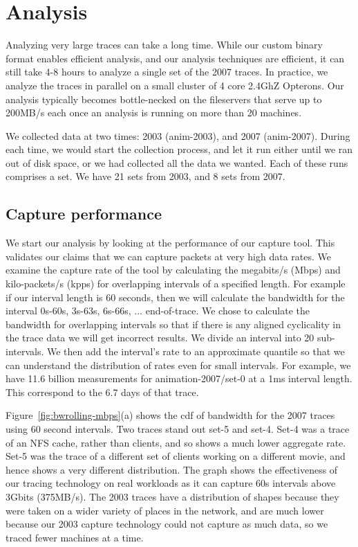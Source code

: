 \section{Analysis}
\label{sec:analysis}

Analyzing very large traces can take a long time.  While our custom
binary format enables efficient analysis, and our analysis techniques
are efficient, it can still take 4-8 hours to analyze a single set of
the 2007 traces.  In practice, we analyze the traces in parallel on a
small cluster of 4 core 2.4GhZ Opterons.  Our analysis typically
becomes bottle-necked on the fileservers that serve up to 200MB/s each
once an analysis is running on more than 20 machines.

We collected data at two times: 2003 (anim-2003), and 2007
(anim-2007).  During each time, we would start the collection
process, and let it run either until we ran out of disk space, or we
had collected all the data we wanted.  Each of these runs comprises a
set.  We have 21 sets from 2003, and 8 sets from 2007.

\subsection{Capture performance}

We start our analysis by looking at the performance of our capture
tool.  This validates our claims that we can capture packets at very
high data rates.  We examine the capture rate of the tool by
calculating the megabits/s (Mbps) and kilo-packets/s (kpps) for
overlapping intervals of a specified length.  For example if our
interval length is 60 seconds, then we will calculate the bandwidth
for the interval 0s-60s, 3s-63s, 6s-66s, ... end-of-trace.  We chose
to calculate the bandwidth for overlapping intervals so that if there
is any aligned cyclicality in the trace data we will get incorrect
results.  We divide an interval into 20 sub-intervals.  We then add the
interval's rate to an approximate quantile so that we can understand
the distribution of rates even for small intervals.  For example, we
have 11.6 billion measurements for animation-2007/set-0 at a 1ms interval
length.  This correspond to the 6.7 days of that trace.

Figure~\ref{fig:bwrolling-mbps}(a) shows the cdf of bandwidth for the
2007 traces using 60 second intervals.  Two traces stand out set-5 and
set-4.  Set-4 was a trace of an NFS cache, rather than clients, and so
shows a much lower aggregate rate.  Set-5 was the trace of a different
set of clients working on a different movie, and hence shows a very
different distribution.  The graph shows the effectiveness of our
tracing technology on real workloads as it can capture 60s intervals
above 3Gbits (375MB/s).  
The 2003 traces have a distribution of shapes because they
were taken on a wider variety of places in the network, and are much
lower because our 2003 capture technology could not capture as much
data, so we traced fewer machines at a time.

